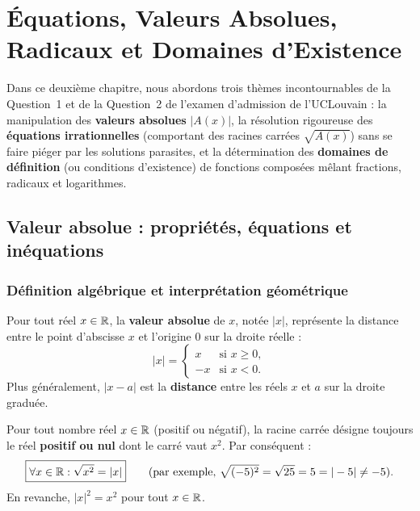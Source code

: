 \chapter{Équations, Valeurs Absolues, Radicaux et Domaines d'Existence}

Dans ce deuxième chapitre, nous abordons trois thèmes incontournables de la Question~1 et de la Question~2 de l'examen d'admission de l'UCLouvain : la manipulation des \textbf{valeurs absolues} $|A(x)|$, la résolution rigoureuse des \textbf{équations irrationnelles} (comportant des racines carrées $\sqrt{A(x)}$) sans se faire piéger par les solutions parasites, et la détermination des \textbf{domaines de définition} (ou conditions d'existence) de fonctions composées mêlant fractions, radicaux et logarithmes.

\section{Valeur absolue : propriétés, équations et inéquations}

\subsection{Définition algébrique et interprétation géométrique}

\begin{definition}
Pour tout réel $x \in \mathbb{R}$, la \textbf{valeur absolue} de $x$, notée $|x|$, représente la distance entre le point d'abscisse $x$ et l'origine $0$ sur la droite réelle :
\[
    \boxed{|x| = \begin{cases} x & \text{si } x \ge 0, \\ -x & \text{si } x < 0. \end{cases}}
\]
Plus généralement, $|x - a|$ est la \textbf{distance} entre les réels $x$ et $a$ sur la droite graduée.
\end{definition}

\begin{attention}[Le piège classique : $\sqrt{x^2} = |x|$ et non $x$ !]
Pour tout nombre réel $x \in \mathbb{R}$ (positif ou négatif), la racine carrée désigne toujours le réel \textbf{positif ou nul} dont le carré vaut $x^2$. Par conséquent :
\[
    \boxed{\forall x \in \mathbb{R} : \sqrt{x^2} = |x|} \qquad \text{(par exemple, } \sqrt{(-5)^2} = \sqrt{25} = 5 = |-5| \neq -5\text{)}.
\]
En revanche, $|x|^2 = x^2$ pour tout $x \in \mathbb{R}$.
\end{attention}

